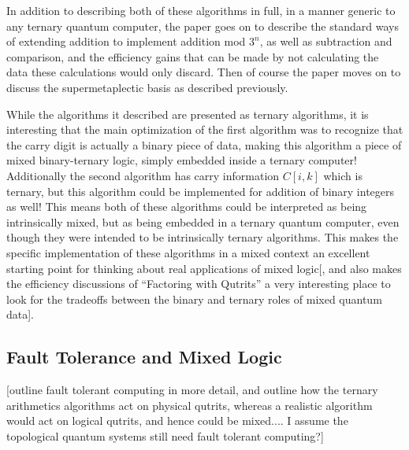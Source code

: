 In addition to describing both of these algorithms in full, in a manner generic to any ternary quantum computer, the paper goes on to describe the standard ways of extending addition to implement addition mod $3^n$, as well as subtraction and comparison, and the efficiency gains that can be made by not calculating the data these calculations would only discard. Then of course the paper moves on to discuss the supermetaplectic basis as described previously.

While the algorithms it described are presented as ternary algorithms, it is interesting that the main optimization of the first algorithm was to recognize that the carry digit is actually a binary piece of data, making this algorithm a piece of mixed binary-ternary logic, simply embedded inside a ternary computer! Additionally the second algorithm has carry information $C[i, k]$ which is ternary, but this algorithm could be implemented for addition of binary integers as well! This means both of these algorithms could be interpreted as being intrinsically mixed, but as being embedded in a ternary quantum computer, even though they were intended to be intrinsically ternary algorithms. This makes the specific implementation of these algorithms in a mixed context an excellent starting point for thinking about real applications of mixed logic[, and also makes the efficiency discussions of ``Factoring with Qutrits'' a very interesting place to look for the tradeoffs between the binary and ternary roles of mixed quantum data].

\subsection{Fault Tolerance and Mixed Logic}
[outline fault tolerant computing in more detail, and outline how the ternary arithmetics algorithms act on physical qutrits, whereas a realistic algorithm would act on logical qutrits, and hence could be mixed.... I assume the topological quantum systems still need fault tolerant computing?]
